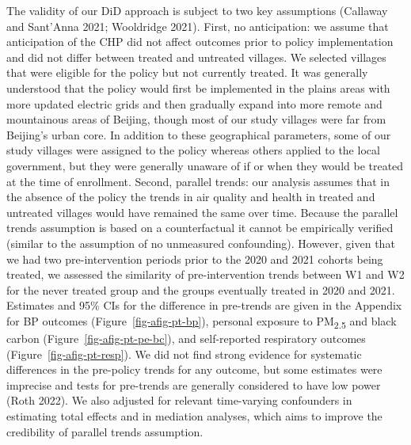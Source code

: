 \documentclass[
  letterpaper,
  DIV=11,
  numbers=noendperiod]{scrartcl}
\begin{document}
The validity of our DiD approach is subject to two key assumptions
(Callaway and Sant'Anna 2021; Wooldridge 2021). First, no anticipation:
we assume that anticipation of the CHP did not affect outcomes prior to
policy implementation and did not differ between treated and untreated
villages. We selected villages that were eligible for the policy but not
currently treated. It was generally understood that the policy would
first be implemented in the plains areas with more updated electric
grids and then gradually expand into more remote and mountainous areas
of Beijing, though most of our study villages were far from Beijing's
urban core. In addition to these geographical parameters, some of our
study villages were assigned to the policy whereas others applied to the
local government, but they were generally unaware of if or when they
would be treated at the time of enrollment. Second, parallel trends: our
analysis assumes that in the absence of the policy the trends in air
quality and health in treated and untreated villages would have remained
the same over time. Because the parallel trends assumption is based on a
counterfactual it cannot be empirically verified (similar to the
assumption of no unmeasured confounding). However, given
that we had two pre-intervention periods prior to the 2020 and 2021
cohorts being treated, we assessed the similarity of pre-intervention
trends between W1 and W2 for the never treated group and the groups
eventually treated in 2020 and 2021. Estimates and 95\% CIs for the
difference in pre-trends are given in the Appendix for BP outcomes
(Figure~\ref{fig-afig-pt-bp}), personal exposure to
PM\textsubscript{2.5} and black carbon (Figure~\ref{fig-afig-pt-pe-bc}),
and self-reported respiratory outcomes (Figure~\ref{fig-afig-pt-resp}).
We did not find strong evidence for systematic differences in the
pre-policy trends for any outcome, but some estimates were imprecise and
tests for pre-trends are generally considered to have low power (Roth
2022). We also adjusted for relevant time-varying confounders in
estimating total effects and in mediation analyses, which aims to
improve the credibility of parallel trends assumption.
\end{document}
